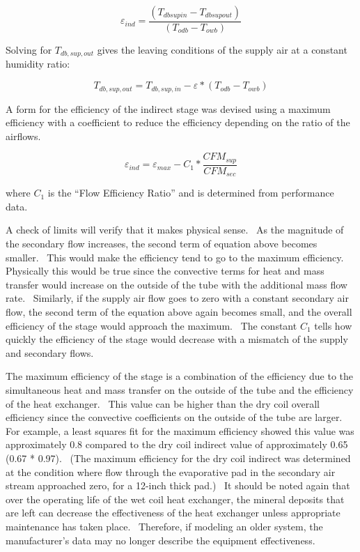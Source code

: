 \begin{equation}
{\varepsilon_{ind}} = \frac{({T_{dbsupin}} - {T_{dbsupout}})}{({T_{odb}} - {T_{owb}})}
\end{equation}

Solving for \(T_{db,sup,out}\) gives the leaving conditions of the supply air at a constant humidity ratio:

\begin{equation}
{T_{db,sup,out}} = {T_{db,sup,in}} - \varepsilon * ({T_{odb}}-{T_{owb}})
\end{equation}

A form for the efficiency of the indirect stage was devised using a maximum efficiency with a coefficient to reduce the efficiency depending on the ratio of the airflows.

\begin{equation}
{\varepsilon_{ind}} = {\varepsilon_{max}} - C_1 * \frac{CFM_{sup}}{CFM_{sec}}
\end{equation}

where \(C_1\) is the ``Flow Efficiency Ratio'' and is determined from performance data.

A check of limits will verify that it makes physical sense.~ As the magnitude of the secondary flow increases, the second term of equation above becomes smaller.~ This would make the efficiency tend to go to the maximum efficiency.~ Physically this would be true since the convective terms for heat and mass transfer would increase on the outside of the tube with the additional mass flow rate.~ Similarly, if the supply air flow goes to zero with a constant secondary air flow, the second term of the equation above again becomes small, and the overall efficiency of the stage would approach the maximum.~ The constant \(C_1\) tells how quickly the efficiency of the stage would decrease with a mismatch of the supply and secondary flows.

The maximum efficiency of the stage is a combination of the efficiency due to the simultaneous heat and mass transfer on the outside of the tube and the efficiency of the heat exchanger.~ This value can be higher than the dry coil overall efficiency since the convective coefficients on the outside of the tube are larger.~ For example, a least squares fit for the maximum efficiency showed this value was approximately 0.8 compared to the dry coil indirect value of approximately 0.65 (0.67 * 0.97).~ (The maximum efficiency for the dry coil indirect was determined at the condition where flow through the evaporative pad in the secondary air stream approached zero, for a 12-inch thick pad.)~ It should be noted again that over the operating life of the wet coil heat exchanger, the mineral deposits that are left can decrease the effectiveness of the heat exchanger unless appropriate maintenance has taken place.~ Therefore, if modeling an older system, the manufacturer's data may no longer describe the equipment effectiveness.

